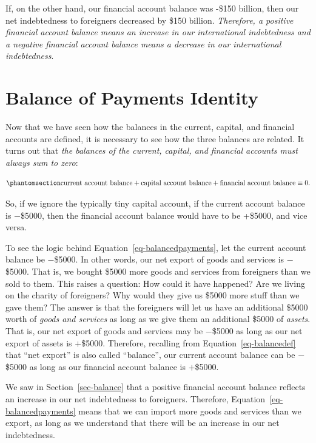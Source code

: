 \documentclass[
  letterpaper,
]{book}
\begin{document}
If, on the other hand, our financial account balance was -\$150 billion,
then our net indebtedness to foreigners decreased by \$150 billion.
\emph{Therefore, a positive financial account balance means an increase
in our international indebtedness and a negative financial account
balance means a decrease in our international indebtedness}.

\section{Balance of Payments Identity}\label{sec-curcap}

Now that we have seen how the balances in the current, capital, and
financial accounts are defined, it is necessary to see how the three
balances are related. It turns out that \emph{the balances of the
current, capital, and financial accounts must always sum to zero}:

\begin{equation}\phantomsection\label{eq-balancedpayments}{
\mbox{current account balance} + \mbox{capital account balance} + \mbox{financial account balance} \equiv 0.
}\end{equation}

So, if we ignore the typically tiny capital account, if the current
account balance is \(-\)\$5000, then the financial account balance would
have to be +\$5000, and vice versa.

To see the logic behind Equation~\ref{eq-balancedpayments}, let the
current account balance be \(-\)\$5000. In other words, our net export
of goods and services is \(-\)\$5000. That is, we bought \$5000 more
goods and services from foreigners than we sold to them. This raises a
question: How could it have happened? Are we living on the charity of
foreigners? Why would they give us \$5000 more stuff than we gave them?
The answer is that the foreigners will let us have an additional \$5000
worth of \emph{goods and services} as long as we give them an additional
\$5000 of \emph{assets}. That is, our net export of goods and services
may be \(-\)\$5000 as long as our net export of assets is \(+\)\$5000.
Therefore, recalling from Equation~\ref{eq-balancedef} that ``net
export'' is also called ``balance'', our current account balance can be
\(-\)\$5000 as long as our financial account balance is \(+\)\$5000.

We saw in Section~\ref{sec-balance} that a positive financial account
balance reflects an increase in our net indebtedness to foreigners.
Therefore, Equation~\ref{eq-balancedpayments} means that we can import
more goods and services than we export, as long as we understand that
there will be an increase in our net indebtedness.
\end{document}

